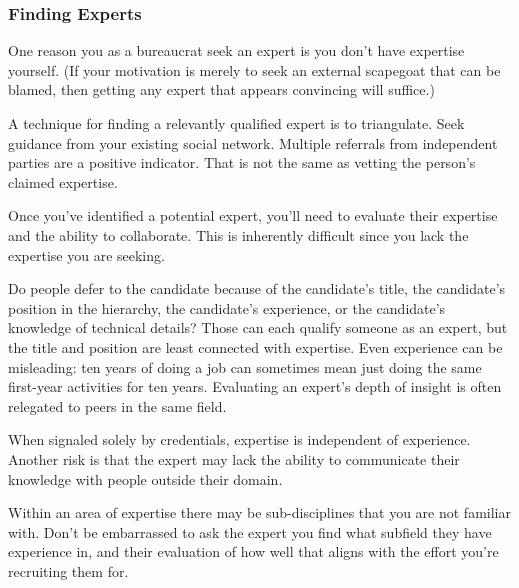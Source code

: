\subsubsection*{Finding Experts}

One reason you as a bureaucrat seek an expert is you don't have expertise yourself. (If your motivation is merely to seek an external scapegoat that can be blamed, then getting any expert that appears convincing will suffice.)

A technique for finding a relevantly qualified expert is to triangulate. 
%
Seek guidance from your existing social network. Multiple referrals from independent parties are a positive indicator. That is not the same as vetting the person's claimed expertise.

Once you've identified a potential expert, you'll need to evaluate their expertise and the ability to collaborate. This is inherently difficult since you lack the expertise you are seeking.

Do people defer to the candidate because of the candidate's title, the candidate's position in the hierarchy, the candidate's experience, or the candidate's knowledge of technical details? Those can each qualify someone as an expert, but the title and position are least connected with expertise. Even experience can be misleading: ten years of doing a job can sometimes mean just doing the same first-year activities for ten years. %
Evaluating an expert's depth of insight is often relegated to peers in the same field. 

 

When signaled solely by credentials, expertise is independent of experience. Another risk is that the expert may lack the ability to communicate their knowledge with people outside their domain.

Within an area of expertise there may be sub-disciplines that you are not familiar with. Don't be embarrassed to ask the expert you find what subfield they have experience in, and their evaluation of how well that aligns with the effort you're recruiting them for.



